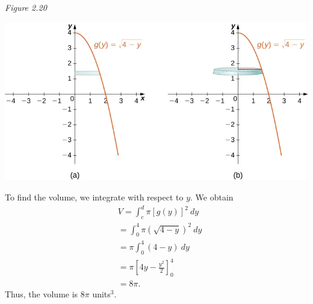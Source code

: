 \documentclass{report}
\begin{document}
  \bigbreak \noindent 
  \textit{Figure 2.20}
  \begin{center}
      \includegraphics[scale=0.5]{./figures/graph23.png}
  \end{center}
  
    \pagebreak \bigbreak \noindent 
    To find the volume, we integrate with respect to \( y \). We obtain
    \begin{align*}
    &V = \int_{c}^{d} \pi [g(y)]^2\ dy \\
    &= \int_{0}^{4} \pi \left( \sqrt{4 - y} \right)^2\ dy \\
    &= \pi \int_{0}^{4} (4 - y)\ dy \\
    &= \pi \left[ 4y - \frac{y^2}{2} \right]_{0}^{4} \\
    &= 8\pi
    .\end{align*}
    Thus, the volume is \( 8\pi \) units\(^3\).

    \bigbreak \noindent 
\end{document}
